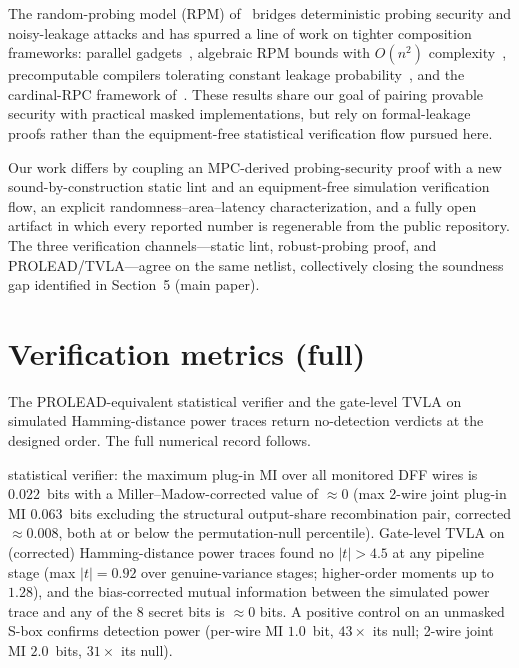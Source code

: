 \documentclass[journal,onecolumn]{IEEEtran}
\begin{document}
The random-probing model (RPM) of~\cite{belaid2020random} bridges
deterministic probing security and noisy-leakage attacks and has spurred
a line of work on tighter composition frameworks: parallel
gadgets~\cite{berti2023parallel}, algebraic RPM bounds
with $O(n^2)$ complexity~\cite{jahandideh2024algebraic}, precomputable
compilers tolerating constant leakage probability~\cite{wang2025precomputation},
and the cardinal-RPC framework
of~\cite{belaid2025cardinal}. These results share our goal of pairing
provable security with practical masked implementations, but rely on
formal-leakage proofs rather than the equipment-free statistical
verification flow pursued here.

Our work differs by coupling an MPC-derived probing-security proof
with a new sound-by-construction static lint and an equipment-free
simulation verification flow, an explicit
randomness--area--latency characterization, and a fully open artifact
in which every reported number is regenerable from the public
repository. The three verification channels---static lint,
robust-probing proof, and PROLEAD/TVLA---agree on the same netlist,
collectively closing the soundness gap identified in
Section~5 (main paper).


\section{Verification metrics (full)}
\label{app:verif-metrics-full}

The PROLEAD-equivalent statistical verifier and the gate-level TVLA on
simulated Hamming-distance power traces return no-detection verdicts
at the designed order.  The full numerical record follows.

statistical verifier: the maximum plug-in MI over all monitored DFF
wires is
$0.022$~bits with a Miller--Madow-corrected value of $\approx 0$
(max 2-wire joint plug-in MI $0.063$~bits excluding the structural
output-share recombination pair, corrected $\approx 0.008$,
both at or below the permutation-null percentile).  Gate-level TVLA on
(corrected) Hamming-distance power traces
found no $|t|{>}4.5$ at any pipeline stage (max $|t| = 0.92$ over
genuine-variance stages; higher-order moments up to $1.28$),
and the bias-corrected mutual information between the simulated power
trace and any of the 8 secret bits is $\approx 0$ bits.  A positive
control on an unmasked S-box confirms detection power (per-wire MI
$1.0$~bit, $43\times$ its null; 2-wire joint MI $2.0$~bits,
$31\times$ its null).
\end{document}
